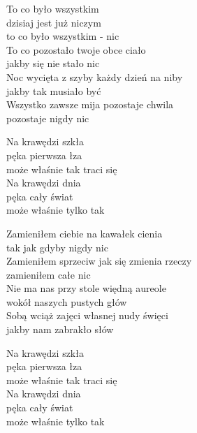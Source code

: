 \begin{text}
    To co było wszystkim\\
    dzisiaj jest już niczym\\
    to co było wszystkim - nic\\
    To co pozostało twoje obce ciało\\
    jakby się nie stało nic\\
    Noc wycięta z szyby każdy dzień na niby\\
    jakby tak musiało być\\
    Wszystko zawsze mija pozostaje chwila\\
    pozostaje nigdy nic

    Na krawędzi szkła\\
    pęka pierwsza łza\\
    może właśnie tak traci się\\
    Na krawędzi dnia\\
    pęka cały świat\\
    może właśnie tylko tak

    Zamieniłem ciebie na kawałek cienia\\
    tak jak gdyby nigdy nic\\
    Zamieniłem sprzeciw jak się zmienia rzeczy\\
    zamieniłem całe nic\\
    Nie ma nas przy stole więdną aureole\\
    wokół naszych pustych głów\\
    Sobą wciąż zajęci własnej nudy święci\\
    jakby nam zabrakło słów

    Na krawędzi szkła\\
    pęka pierwsza łza\\
    może właśnie tak traci się\\
    Na krawędzi dnia\\
    pęka cały świat\\
    może właśnie tylko tak
\end{text}
\begin{chord}

\end{chord}